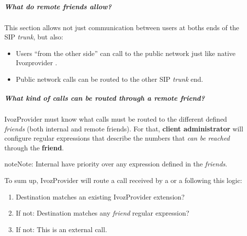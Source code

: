 \documentclass[letterpaper,10pt,english]{sphinxmanual}
\begin{document}
\subparagraph{What do remote friends allow?}
\label{administration_portal/client/vpbx/routing_endpoints/friends/remote_friends:what-do-remote-friends-allow}
This section allows not just communication between users at boths ends of the
SIP \emph{trunk}, but also:
\begin{itemize}
\item {} 
Users ``from the other side'' can call to the public network just like native
Ivozprovider {\hyperref[administration_portal/client/vpbx/users:users]{}}.

\item {} 
Public network calls can be routed to the other SIP \emph{trunk} end.

\end{itemize}


\subparagraph{What kind of calls can be routed through a \emph{remote friend}?}
\label{administration_portal/client/vpbx/routing_endpoints/friends/remote_friends:what-kind-of-calls-can-be-routed-through-a-remote-friend}
IvozProvider must know what calls must be routed to the different defined \emph{friends} (both internal and remote friends).
For that, \textbf{client administrator} will configure regular expressions that
describe the numbers that \emph{can be reached} through the \textbf{friend}.

\begin{notice}{note}{Note:}
Internal {\hyperref[administration_portal/client/vpbx/extensions:extensions]{}} have priority over any expression
defined in the \emph{friends}.
\end{notice}

To sum up, IvozProvider will route a call received by a {\hyperref[administration_portal/client/vpbx/users:users]{}} or
a {\hyperref[administration_portal/client/vpbx/routing_endpoints/friends/index:friends]{}} following this logic:
\begin{enumerate}
\item {} 
Destination matches an existing IvozProvider extension?

\item {} 
If not: Destination matches any \emph{friend} regular expression?

\item {} 
If not: This is an external call.

\end{enumerate}
\end{document}
